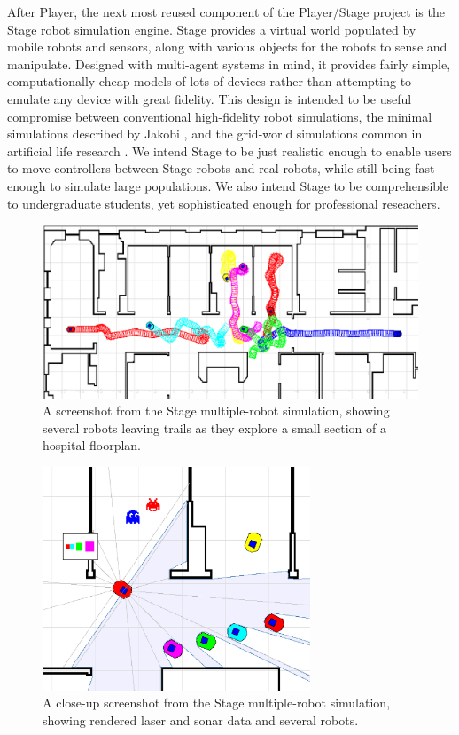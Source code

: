 After Player, the next most reused component of the Player/Stage
project is the Stage robot simulation engine. Stage provides a virtual
world populated by mobile robots and sensors, along with various
objects for the robots to sense and manipulate.  Designed with
multi-agent systems in mind, it provides fairly simple,
computationally cheap models of lots of devices rather than attempting
to emulate any device with great fidelity. This design is intended to
be useful compromise between conventional high-fidelity robot
simulations, the minimal simulations described by Jakobi
\cite{32_jakobi:ab}, and the grid-world simulations common in artificial
life research \cite{32_wilson:animat}. We intend Stage to be just realistic
enough to enable users to move controllers between Stage robots and
real robots, while still being fast enough to simulate large
populations. We also intend Stage to be comprehensible to
undergraduate students, yet sophisticated enough for professional
reseachers.

\begin{figure}[top]
\begin{center}
\includegraphics[width=\columnwidth]{ps_stage2}
\caption{\label{fig:ch32-stage}A screenshot from the Stage multiple-robot simulation, showing several robots leaving trails as they explore a small section of a hospital floorplan.}
\end{center}
\end{figure}


\begin{figure}[top]
\begin{center}
\includegraphics[width=80mm]{ps_stage}
\caption{\label{fig:ch32-stage2}A close-up screenshot from the Stage multiple-robot simulation, showing rendered laser and sonar data and several robots.}
\end{center}
\end{figure}

